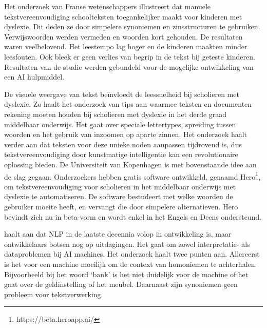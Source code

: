 
Het onderzoek van Franse wetenschappers \newline \textcite{Gala2016} illustreert dat manuele tekstvereenvoudiging schoolteksten toegankelijker \newline maakt voor kinderen met dyslexie. Dit deden ze door simpelere synoniemen en zinsstructuren te gebruiken. Verwijswoorden werden vermeden en woorden kort gehouden. De resultaten waren veelbelovend. Het leestempo lag hoger en de kinderen maakten minder leesfouten. Ook bleek er geen verlies van begrip in de tekst bij geteste kinderen. Resultaten van de studie werden gebundeld voor de mogelijke ontwikkeling van een AI hulpmiddel.

De visuele weergave van tekst beïnvloedt de leessnelheid bij scholieren met dyslexie. Zo haalt het onderzoek van \textcite{Rello2012} tips aan waarmee teksten en documenten rekening moeten houden bij scholieren met dyslexie in het derde graad middelbaar onderwijs. Het gaat over speciale lettertypes, spreiding tussen woorden en het gebruik van inzoomen op aparte zinnen. Het onderzoek haalt verder aan dat teksten voor deze unieke noden aanpassen tijdrovend is, dus tekstvereenvoudiging door kunstmatige intelligentie kan een revolutionaire oplossing bieden. De Universiteit van Kopenhagen is met bovenstaande idee aan de slag gegaan. Onderzoekers \textcite{Bingel2018} hebben gratis software ontwikkeld, genaamd Hero\footnote{https://beta.heroapp.ai/}, om tekstvereenvoudiging voor scholieren in het middelbaar onderwijs met dyslexie te automatiseren. De software bestudeert met welke woorden de gebruiker moeite heeft, en vervangt die door simpelere alternatieven. Hero bevindt zich nu in beta-vorm en wordt enkel in het Engels en Deens ondersteund. 

\textcite{Roldos2020} haalt aan dat NLP in de laatste decennia volop in ontwikkeling is, maar ontwikkelaars botsen nog op uitdagingen. Het gaat om zowel interpretatie- als dataproblemen bij AI machines. Het onderzoek haalt twee punten aan. Allereerst is het voor een machine moeilijk om de context van homoniemen te achterhalen. Bijvoorbeeld bij het woord ‘bank’ is het niet duidelijk voor de machine of het gaat over de geldinstelling of het meubel. Daarnaast zijn synoniemen geen probleem voor tekstverwerking.

